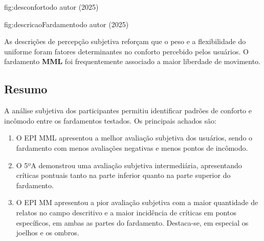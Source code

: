         {fig:desconforto}{}{do autor (2025)}

        {fig:descricaoFardamento}{}{do autor (2025)}

        As descrições de percepção subjetiva reforçam que o peso e a flexibilidade do uniforme foram 
        fatores determinantes no conforto percebido pelos usuários. O fardamento \textbf{\acrlong{MML}} foi 
        frequentemente associado a maior liberdade de movimento.
    \subsection{Resumo}
    A análise subjetiva dos participantes permitiu identificar padrões de conforto e incômodo entre 
    os fardamentos testados. Os principais achados são:

    \begin{enumerate}[label=\Roman*.] %
        \item O \acrshort{EPI} \acrlong{MML} apresentou a melhor avaliação subjetiva dos usuários, 
        sendo o fardamento com menos avaliações negativas e menos pontos de incômodo.
        \item O 5ºA demonstrou uma avaliação subjetiva intermediária, apresentando críticas 
        pontuais tanto na parte inferior quanto na parte superior do fardamento.
        \item O \acrshort{EPI} \acrlong{MM} apresentou a pior avaliação subjetiva 
        com a maior quantidade de relatos no campo descritivo e a maior incidência de críticas em 
        pontos específicos, em ambas as partes do fardamento. Destaca-se, em especial os joelhos 
        e os ombros.
        \end{enumerate}
